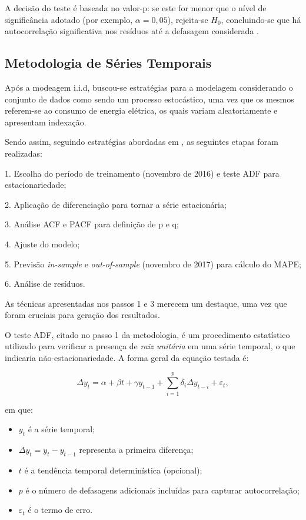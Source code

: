 \documentclass[journal]{IEEEtran}
\begin{document}
A decisão do teste é baseada no valor-p: se este for menor que o nível de significância 
adotado (por exemplo, $\alpha = 0{,}05$), rejeita-se $H_0$, concluindo-se que há 
autocorrelação significativa nos resíduos até a defasagem considerada \cite{ljungbox1978}.

\subsection {Metodologia de Séries Temporais}
Após a modeagem i.i.d, buscou-se estratégias para a modelagem considerando o conjunto de dados como sendo um processo estocástico, uma vez que os mesmos referem-se ao consumo de energia elétrica, os quais variam aleatoriamente e apresentam indexação.

Sendo assim, seguindo estratégias abordadas em  \cite{nielsen2019}, as seguintes etapas foram realizadas:

1. Escolha do período de treinamento (novembro de 2016) e teste ADF para estacionariedade;

2. Aplicação de diferenciação para tornar a série estacionária;

3. Análise ACF e PACF para definição de p e q;

4. Ajuste do modelo;

5. Previsão \emph{in-sample} e \emph{out-of-sample} (novembro de 2017) para cálculo do MAPE;

6. Análise de resíduos.

As técnicas apresentadas nos passos 1 e 3 merecem um destaque, uma vez que foram cruciais para geração dos resultados. 

O teste ADF, citado no passo 1 da metodologia, é um procedimento estatístico utilizado para verificar a presença de \textit{raiz unitária} em uma série temporal, o que indicaria não-estacionariedade.
A forma geral da equação testada é:


 \begin{equation}
    \Delta y_t = \alpha + \beta t + \gamma y_{t-1} + \sum_{i=1}^{p} \delta_i \Delta y_{t-i} + \varepsilon_t,
    \label{eq:eq-signal}
\end{equation}

em que:
\begin{itemize}
    \item $y_t$ é a série temporal;
    \item $\Delta y_t = y_t - y_{t-1}$ representa a primeira diferença;
    \item $t$ é a tendência temporal determinística (opcional);
    \item $p$ é o número de defasagens adicionais incluídas para capturar autocorrelação;
    \item $\varepsilon_t$ é o termo de erro.
\end{itemize}
\end{document}
